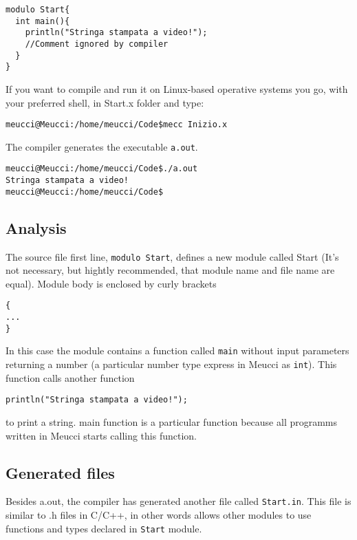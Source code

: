 \documentclass[10pt]{book}%
\newcommand{\code}[1]{\texttt{#1}}
\newenvironment{codeenv}{
\begin{mdframed}[backgroundcolor=black!20,topline=false,leftline=false,rightline=false,bottomline=false]
}
{\end{mdframed}}
\begin{document}
\begin{codeenv}
\begin{verbatim}
modulo Start{
  int main(){
    println("Stringa stampata a video!");
    //Comment ignored by compiler
  }
}
\end{verbatim}
\end{codeenv}

If you want to compile and run it on Linux-based operative systems you go, with your preferred shell, in Start.x folder and type:

\begin{codeenv}
\begin{verbatim}
meucci@Meucci:/home/meucci/Code$mecc Inizio.x
\end{verbatim}
\end{codeenv}

The compiler generates the executable \code{a.out}.
\begin{codeenv}
\begin{verbatim}
meucci@Meucci:/home/meucci/Code$./a.out
Stringa stampata a video!
meucci@Meucci:/home/meucci/Code$
\end{verbatim}
\end{codeenv}
\subsection*{Analysis}
The source file first line, \code{modulo Start}, defines a new module called Start (It's not necessary, but hightly recommended, that module name and file name are equal). Module body is enclosed by curly brackets
\begin{codeenv}
\begin{verbatim}
{
...
}
\end{verbatim}
\end{codeenv}
In this case the module contains a function called \code{main} without input parameters returning a number (a particular number type express in Meucci as \code{int}). This function calls another function
\begin{codeenv}
\begin{verbatim}
println("Stringa stampata a video!");
\end{verbatim}
\end{codeenv}
to print a string. main function is a particular function because all programms written in Meucci starts calling this function.

\subsection*{Generated files}
Besides a.out, the compiler has generated another file called \code{Start.in}. This file is similar to .h files in C/C++, in other words allows other modules to use functions and types declared in \code{Start} module.
\end{document}
